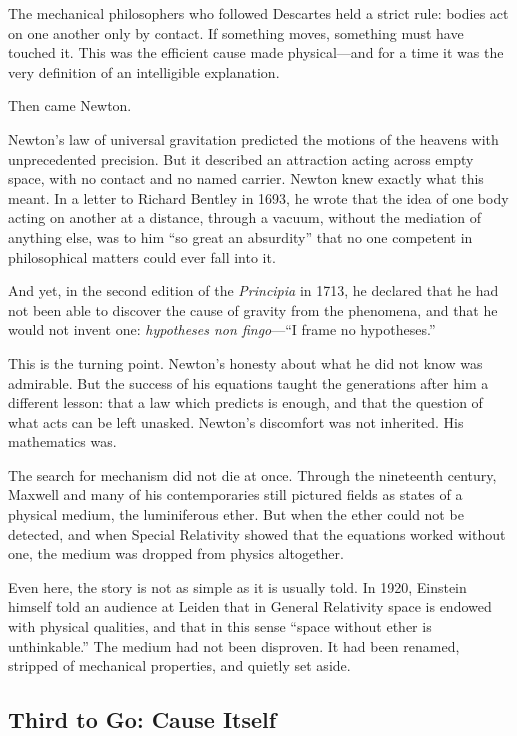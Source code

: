 \documentclass[11pt,a4paper]{article}
\begin{document}
The mechanical philosophers who followed Descartes held a strict rule: bodies act on one another only by contact. If something moves, something must have touched it. This was the efficient cause made physical---and for a time it was the very definition of an intelligible explanation.

Then came Newton.

Newton's law of universal gravitation predicted the motions of the heavens with unprecedented precision. But it described an attraction acting across empty space, with no contact and no named carrier. Newton knew exactly what this meant. In a letter to Richard Bentley in 1693, he wrote that the idea of one body acting on another at a distance, through a vacuum, without the mediation of anything else, was to him ``so great an absurdity'' that no one competent in philosophical matters could ever fall into it.

And yet, in the second edition of the \emph{Principia} in 1713, he declared that he had not been able to discover the cause of gravity from the phenomena, and that he would not invent one: \emph{hypotheses non fingo}---``I frame no hypotheses.''

This is the turning point. Newton's honesty about what he did not know was admirable. But the success of his equations taught the generations after him a different lesson: that a law which predicts is enough, and that the question of what acts can be left unasked. Newton's discomfort was not inherited. His mathematics was.

The search for mechanism did not die at once. Through the nineteenth century, Maxwell and many of his contemporaries still pictured fields as states of a physical medium, the luminiferous ether. But when the ether could not be detected, and when Special Relativity showed that the equations worked without one, the medium was dropped from physics altogether.

Even here, the story is not as simple as it is usually told. In 1920, Einstein himself told an audience at Leiden that in General Relativity space is endowed with physical qualities, and that in this sense ``space without ether is unthinkable.'' The medium had not been disproven. It had been renamed, stripped of mechanical properties, and quietly set aside.

\subsection{Third to Go: Cause Itself}
\end{document}

